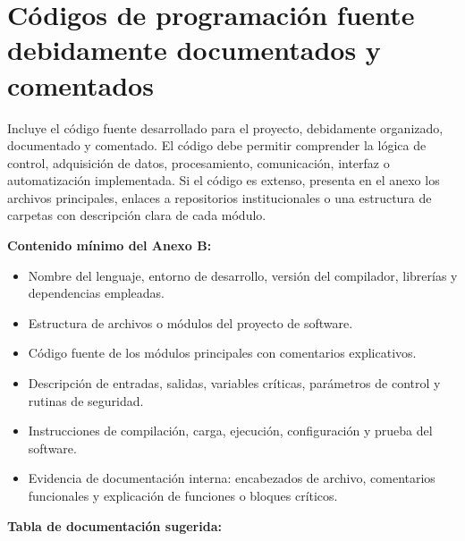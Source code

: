 \documentclass[12pt,letterpaper]{report}
\begin{document}
\chapter{Códigos de programación fuente debidamente documentados y comentados}

\begin{instrucciones}
Incluye el código fuente desarrollado para el proyecto, debidamente organizado, documentado y comentado. El código debe permitir comprender la lógica de control, adquisición de datos, procesamiento, comunicación, interfaz o automatización implementada. Si el código es extenso, presenta en el anexo los archivos principales, enlaces a repositorios institucionales o una estructura de carpetas con descripción clara de cada módulo.

\vspace{2mm}
\noindent \textbf{Contenido mínimo del Anexo B:}
\begin{itemize}
  \item Nombre del lenguaje, entorno de desarrollo, versión del compilador, librerías y dependencias empleadas.
  \item Estructura de archivos o módulos del proyecto de software.
  \item Código fuente de los módulos principales con comentarios explicativos.
  \item Descripción de entradas, salidas, variables críticas, parámetros de control y rutinas de seguridad.
  \item Instrucciones de compilación, carga, ejecución, configuración y prueba del software.
  \item Evidencia de documentación interna: encabezados de archivo, comentarios funcionales y explicación de funciones o bloques críticos.
\end{itemize}

\vspace{2mm}
\noindent \textbf{Tabla de documentación sugerida:}


\end{instrucciones}
\end{document}
